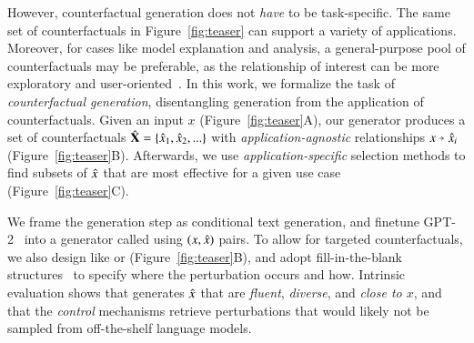 % 
However, counterfactual generation does not \emph{have} to be task-specific.
The same set of counterfactuals in Figure~\ref{fig:teaser} can support a variety of applications.
Moreover, for cases like model explanation and analysis, a general-purpose pool of counterfactuals may be preferable, as the relationship of interest can be more exploratory and user-oriented~\cite{wu2019errudite}.
In this work, we formalize the task of \emph{counterfactual generation}, disentangling generation from the application of counterfactuals.
Given an input $x$ (Figure~\ref{fig:teaser}A), our generator produces a set of counterfactuals $\hat{\mathbf{X}} = \{\hat{x}_1, \hat{x}_2, ...\}$ with \emph{application-agnostic} relationships $x \veryshortarrow \xp_i$ (Figure~\ref{fig:teaser}B).
Afterwards, we use \emph{application-specific} selection methods to find subsets of $\hat{x}$ that are most effective for a given use case (Figure~\ref{fig:teaser}C).

We frame the generation step as conditional text generation, and finetune GPT-2~\cite{radford2019language} into a generator called \emph{\sysname} using $(x, \hat{x})$ pairs. 
To allow for targeted counterfactuals, we also design \tagstrs like  or  (Figure~\ref{fig:teaser}B), and adopt fill-in-the-blank structures~\cite{donahue2020enabling} to specify where the perturbation occurs and how.
Intrinsic evaluation shows that \sysname generates $\hat{x}$ that are \emph{fluent}, \emph{diverse}, and \emph{close to $x$}, and that the \emph{control} mechanisms retrieve perturbations that would likely not be sampled from off-the-shelf language models. %

